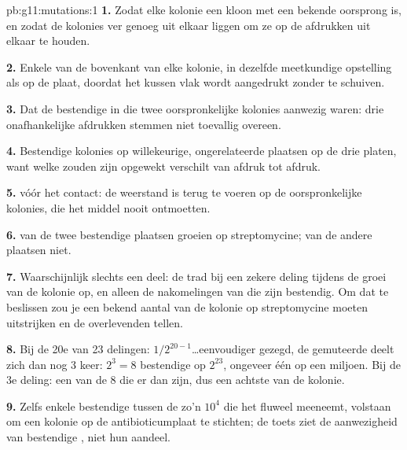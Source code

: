 \begin{solution}{pb:g11:mutations:1}
\textbf{1.} Zodat elke kolonie een kloon met een bekende oorsprong is, en
zodat de kolonies ver genoeg uit elkaar liggen om ze op de afdrukken uit
elkaar te houden.

\textbf{2.} Enkele  van de bovenkant van elke kolonie, in dezelfde
meetkundige opstelling als op de plaat, doordat het kussen vlak wordt
aangedrukt zonder te schuiven.

\textbf{3.} Dat de bestendige  in die twee oorspronkelijke kolonies
aanwezig waren: drie onafhankelijke afdrukken stemmen niet toevallig
overeen.

\textbf{4.} Bestendige kolonies op willekeurige, ongerelateerde plaatsen
op de drie platen, want welke  zouden zijn opgewekt verschilt van
afdruk tot afdruk.

\textbf{5.}  vóór het contact: de weerstand is terug te voeren op
de oorspronkelijke kolonies, die het middel nooit ontmoetten.

\textbf{6.}  van de twee bestendige plaatsen groeien op
streptomycine;  van de andere plaatsen niet.

\textbf{7.} Waarschijnlijk slechts een deel: de  trad bij een
zekere deling tijdens de groei van de kolonie op, en alleen de
nakomelingen van die  zijn bestendig. Om dat te beslissen zou je een
bekend aantal  van de kolonie op streptomycine moeten uitstrijken
en de overlevenden tellen.

\textbf{8.} Bij de 20e van 23 delingen: $1/2^{20-1}$\dots eenvoudiger
gezegd, de gemuteerde  deelt zich dan nog 3 keer: $2^3 = 8$ bestendige
 op $2^{23}$, ongeveer één op een miljoen. Bij de 3e deling: een
van de 8  die er dan zijn, dus een achtste van de kolonie.

\textbf{9.} Zelfs enkele bestendige  tussen de zo'n $10^4$ die het
fluweel meeneemt, volstaan om een kolonie op de antibioticumplaat te
stichten; de toets ziet de aanwezigheid van bestendige , niet hun
aandeel.


\end{solution}
